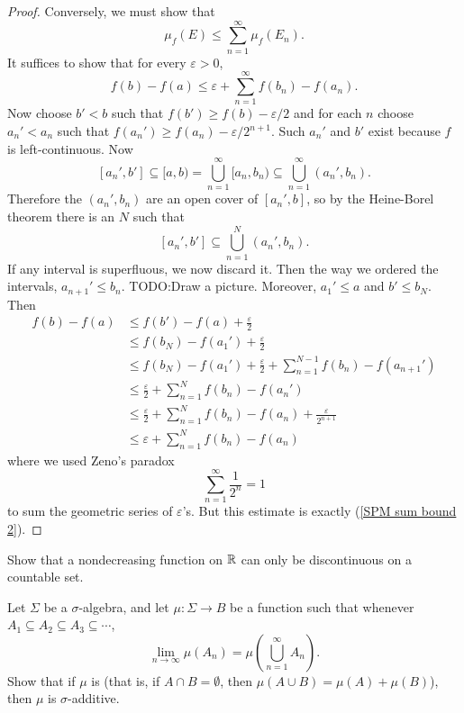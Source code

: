 \begin{proof}
Conversely, we must show that
\[\mu_{f}(E) \leq \sum_{n=1}^{\infty} \mu_{f}(E_{n}).\]
It suffices to show that for every $\varepsilon > 0$,
\begin{equation}\label{SPM sum bound 2}
f(b) - f(a) \leq \varepsilon + \sum_{n=1}^{\infty} f(b_{n}) - f(a_{n}).
\end{equation}
Now choose $b' < b$ such that $f(b') \geq f(b) - \varepsilon/2$ and for each $n$ choose $a_{n}' < a_{n}$ such that $f(a_{n}') \geq f(a_{n}) - \varepsilon/2^{n+1}$.
Such $a_{n}'$ and $b'$ exist because $f$ is left-continuous.
Now
\[[a_{n}', b'] \subseteq [a, b) = \bigcup_{n=1}^{\infty} [a_{n}, b_{n}) \subseteq \bigcup_{n=1}^{\infty} (a_{n}', b_{n}).\]
Therefore the $(a_{n}', b_{n})$ are an open cover of $[a_{n}', b]$, so by the Heine-Borel theorem there is an $N$ such that
\[[a_{n}', b'] \subseteq \bigcup_{n=1}^{N} (a_{n}', b_{n}).\]
If any interval is superfluous, we now discard it.
Then the way we ordered the intervals, $a_{n+1}' \leq b_{n}$.
TODO:\@ Draw a picture.
Moreover, $a_{1}' \leq a$ and $b' \leq b_{N}$. Then
\begin{align*}
f(b) - f(a) &\leq f(b') - f(a) + \frac{\varepsilon}{2}\\
& \leq f(b_{N}) - f(a_{1}') + \frac{\varepsilon}{2}\\
& \leq f(b_{N}) - f(a_{1}') + \frac{\varepsilon}{2} + \sum_{n=1}^{N-1} f(b_{n}) - f(a_{n+1}')\\
& \leq \frac{\varepsilon}{2} + \sum_{n=1}^{N} f(b_{n}) - f(a_{n}')\\
& \leq \frac{\varepsilon}{2} + \sum_{n=1}^{N} f(b_{n}) - f(a_{n}) + \frac{\varepsilon}{2^{n+1}}\\
& \leq \varepsilon + \sum_{n=1}^{N} f(b_{n}) - f(a_{n})
\end{align*}
where we used Zeno's paradox
\begin{equation}\label{zeno}
\sum_{n=1}^{\infty} \frac{1}{2^{n}} = 1
\end{equation}
to sum the geometric series of $\varepsilon$'s.
But this estimate is exactly (\ref{SPM sum bound 2}).
\end{proof}

\begin{exercise}\label{nondecreasing exercise}
Show that a nondecreasing function on $\mathbb{R}$ can only be discontinuous on a countable set.
\end{exercise}

\begin{exercise}
Let $\Sigma$ be a $\sigma$-algebra, and let $\mu: \Sigma \to B$ be a function such that whenever $A_{1} \subseteq A_{2} \subseteq A_{3} \subseteq \cdots$,
\[\lim_{n \to \infty} \mu(A_{n}) = \mu\left(\bigcup_{n=1}^{\infty} A_{n}\right).\]
Show that if $\mu$ is  (that is, if $A \cap B = \emptyset$, then $\mu(A \cup B) = \mu(A) + \mu(B)$), then $\mu$ is $\sigma$-additive.
\end{exercise}

